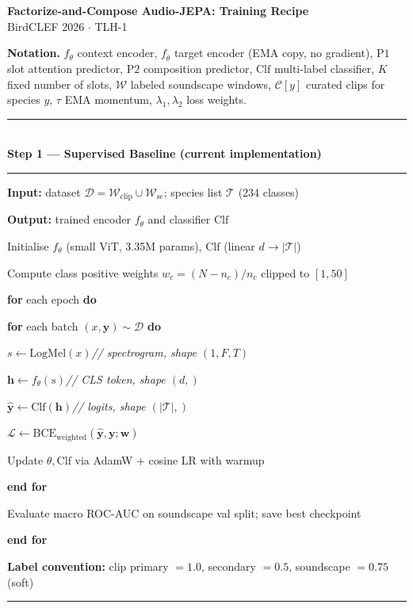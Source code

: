 \documentclass[11pt]{article}
\newcounter{algline}
\newenvironment{pseudo}[1]{%
  \setcounter{algline}{0}%
  \par\addvspace{6pt}%
  \noindent\rule{\linewidth}{0.8pt}\\[-2pt]%
  {\small\textbf{#1}}\\[-4pt]%
  \noindent\rule{\linewidth}{0.4pt}\par%
  \begin{list}{}{%
    \setlength{\leftmargin}{1.6em}%
    \setlength{\itemsep}{1.5pt}%
    \setlength{\parsep}{0pt}%
    \setlength{\topsep}{3pt}%
  }\small%
}{%
  \end{list}%
  \noindent\rule{\linewidth}{0.8pt}\par\addvspace{6pt}%
}
\newcommand{\lLine}[1]{%
  \item[{\makebox[1.2em][r]{\scriptsize\color{gray}\refstepcounter{algline}\thealgline}}]%
  #1}
\newcommand{\lSkip}{\item[]}
\newcommand{\lCmt}[1]{\hfill\footnotesize\color{gray}\textit{// #1}}
\begin{document}
\begin{center}
  {\large\bfseries Factorize-and-Compose Audio-JEPA: Training Recipe}\\[4pt]
  {\small BirdCLEF 2026 $\cdot$ TLH-1}
\end{center}

\medskip

\noindent\textbf{Notation.}\quad
$f_\theta$ context encoder,\;
$f_{\bar\theta}$ target encoder (EMA copy, no gradient),\;
$\mathrm{P1}$ slot attention predictor,\;
$\mathrm{P2}$ composition predictor,\;
$\mathrm{Clf}$ multi-label classifier,\;
$K$ fixed number of slots,\;
$\mathcal{W}$ labeled soundscape windows,\;
$\mathcal{C}[y]$ curated clips for species $y$,\;
$\tau$ EMA momentum,\;
$\lambda_1,\lambda_2$ loss weights.

\bigskip

\begin{pseudo}{Step 1 — Supervised Baseline (current implementation)}
\lLine{\textbf{Input:} dataset $\mathcal{D} = \mathcal{W}_{\mathrm{clip}} \cup \mathcal{W}_{\mathrm{sc}}$;\; species list $\mathcal{T}$ (234 classes)}
\lLine{\textbf{Output:} trained encoder $f_\theta$ and classifier $\mathrm{Clf}$}
\lSkip
\lLine{Initialise $f_\theta$ (small ViT, 3.35M params),\; $\mathrm{Clf}$ (linear $d\!\to\!|\mathcal{T}|$)}
\lLine{Compute class positive weights $w_c = (N - n_c)/n_c$ clipped to $[1, 50]$}
\lLine{\textbf{for} each epoch \textbf{do}}
\lLine{\quad\textbf{for} each batch $(x, \mathbf{y})\sim\mathcal{D}$ \textbf{do}}
\lLine{\quad\quad $s \leftarrow \mathrm{LogMel}(x)$\lCmt{spectrogram, shape $(1, F, T)$}}
\lLine{\quad\quad $\mathbf{h} \leftarrow f_\theta(s)$\lCmt{CLS token, shape $(d,)$}}
\lLine{\quad\quad $\hat{\mathbf{y}} \leftarrow \mathrm{Clf}(\mathbf{h})$\lCmt{logits, shape $(|\mathcal{T}|,)$}}
\lLine{\quad\quad $\mathcal{L} \leftarrow \mathrm{BCE}_{\mathrm{weighted}}(\hat{\mathbf{y}},\mathbf{y};\mathbf{w})$}
\lLine{\quad\quad Update $\theta,\mathrm{Clf}$ via AdamW $+$ cosine LR with warmup}
\lLine{\quad \textbf{end for}}
\lLine{\quad Evaluate macro ROC-AUC on soundscape val split; save best checkpoint}
\lLine{\textbf{end for}}
\lSkip
\lLine{\textbf{Label convention:}\; clip primary $= 1.0$,\; secondary $= 0.5$,\;
       soundscape $= 0.75$ (soft)}
\end{pseudo}

\bigskip
\end{document}
